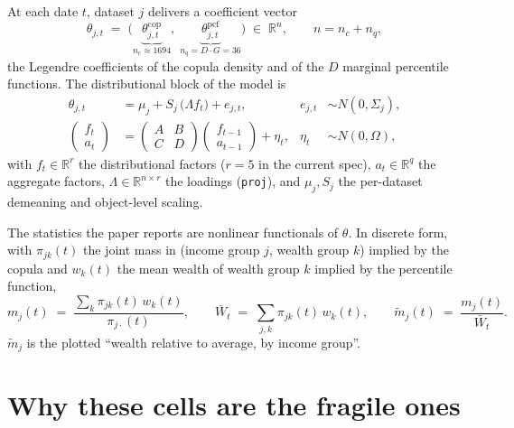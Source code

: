 \documentclass[11pt]{article}
\newcommand{\cop}{\mathrm{cop}}
\newcommand{\pcf}{\mathrm{pcf}}
\newcommand{\code}[1]{\texttt{#1}}
\begin{document}
At each date $t$, dataset $j$ delivers a coefficient vector
\begin{equation}
  \theta_{j,t} \;=\; \bigl( \underbrace{\theta^{\cop}_{j,t}}_{n_c \approx 1694},\;
                            \underbrace{\theta^{\pcf}_{j,t}}_{n_q = D\cdot G = 36} \bigr)
  \;\in\; \mathbb{R}^{n}, \qquad n = n_c + n_q ,
\end{equation}
the Legendre coefficients of the copula density and of the $D$ marginal
percentile functions. The distributional block of the model is
\begin{align}
  \theta_{j,t} &= \mu_j + S_j\,\bigl( \Lambda f_t \bigr) + e_{j,t},
  &  e_{j,t} &\sim N(0,\Sigma_j), \label{eq:meas}\\
  \begin{pmatrix} f_t \\ a_t \end{pmatrix}
   &= \begin{pmatrix} A & B \\ C & D \end{pmatrix}
      \begin{pmatrix} f_{t-1} \\ a_{t-1} \end{pmatrix} + \eta_t,
  & \eta_t &\sim N(0,\Omega), \label{eq:state}
\end{align}
with $f_t \in \mathbb{R}^r$ the distributional factors ($r=5$ in the current
spec), $a_t \in \mathbb{R}^q$ the aggregate factors, $\Lambda \in
\mathbb{R}^{n\times r}$ the loadings (\code{proj}), and $\mu_j, S_j$ the
per-dataset demeaning and object-level scaling.

The statistics the paper reports are nonlinear functionals of $\theta$. In
discrete form, with $\pi_{jk}(t)$ the joint mass in (income group $j$, wealth
group $k$) implied by the copula and $w_k(t)$ the mean wealth of wealth group
$k$ implied by the percentile function,
\begin{equation}
  m_j(t) \;=\; \frac{\sum_k \pi_{jk}(t)\, w_k(t)}{\pi_{j\cdot}(t)},
  \qquad
  \bar W_t \;=\; \sum_{j,k} \pi_{jk}(t)\, w_k(t),
  \qquad
  \tilde m_j(t) \;=\; \frac{m_j(t)}{\bar W_t} .
  \label{eq:cell}
\end{equation}
$\tilde m_j$ is the plotted ``wealth relative to average, by income group''.

\section{Why these cells are the fragile ones}\label{sec:fragile}
\end{document}
